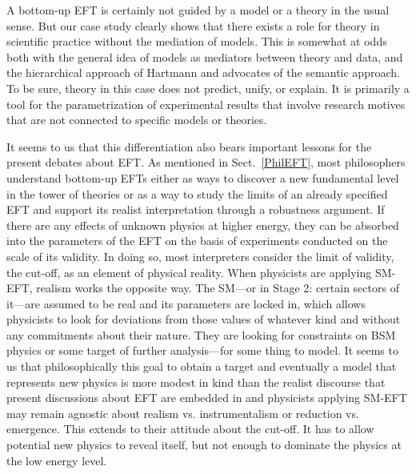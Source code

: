 A bottom-up EFT is certainly not guided by a model or a theory in the usual sense. But our case study clearly shows that there exists a role for theory in scientific practice without the mediation of models. 
This is somewhat at odds both with the general idea of models as mediators between theory and data, and the hierarchical approach of Hartmann and advocates of the semantic approach. 
To be sure, theory in this case does not predict, unify, or explain. 
It is primarily a tool for the parametrization of experimental results that involve research motives that are not connected to specific models or theories.

It seems to us that this differentiation also bears important lessons for the present debates about EFT. 
As mentioned in Sect.~\ref{PhilEFT}, most philosophers understand bottom-up EFTs either as ways to discover a new fundamental level in the tower of theories  or as a way to study the limits of an already specified EFT and support its realist interpretation through a robustness argument. 
If there are any effects of unknown physics at higher energy, they can be absorbed into the parameters of the EFT on the basis of experiments conducted on the scale of its validity. 
In doing so, most interpreters consider the limit of validity, the cut-off, as an element of physical reality. When physicists are applying SM-EFT, realism works the opposite way. 
The SM---or in Stage 2: certain sectors of it---are assumed to be real and its parameters are locked in, which allows physicists to look for deviations from those values of whatever kind and without any commitments about their nature. 
They are looking for constraints on BSM physics or some target of further analysis---for some thing to model. 
It seems to us that philosophically this goal to obtain a target and eventually a model that represents new physics is more modest in kind than the realist discourse that present discussions about EFT are embedded in and physicists applying SM-EFT may remain agnostic about realism vs. instrumentalism or reduction vs. emergence. 
This extends to their attitude about the cut-off. It has to allow potential new physics to reveal itself, but not enough to dominate the physics at the low energy level.
